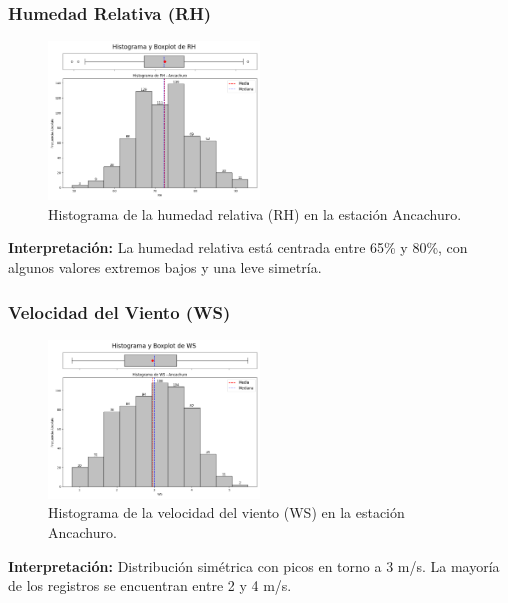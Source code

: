 \subsubsection*{Humedad Relativa (RH)}
\begin{figure}[H]
\centering
\includegraphics[width=0.5\textwidth]{resultados/por_estacion_meteorologica/Ancachuro/RH_histograma.png}
\caption{Histograma de la humedad relativa (RH) en la estación Ancachuro.}
\label{fig:ancachuro_RH}
\end{figure}
\textbf{Interpretación:} La humedad relativa está centrada entre 65\% y 80\%, con algunos valores extremos bajos y una leve simetría.

\subsubsection*{Velocidad del Viento (WS)}
\begin{figure}[H]
\centering
\includegraphics[width=0.5\textwidth]{resultados/por_estacion_meteorologica/Ancachuro/WS_histograma.png}
\caption{Histograma de la velocidad del viento (WS) en la estación Ancachuro.}
\label{fig:ancachuro_WS}
\end{figure}
\textbf{Interpretación:} Distribución simétrica con picos en torno a 3 m/s. La mayoría de los registros se encuentran entre 2 y 4 m/s.

